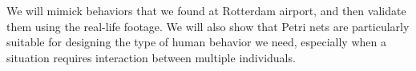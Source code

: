 \documentclass[11pt, a4paper]{book}
\begin{document}
We will mimick behaviors that we found at Rotterdam airport, and then validate them using the real-life footage. We will also show that Petri nets are particularly suitable for designing the type of human behavior we need, especially when a situation requires interaction between multiple individuals.







\end{document}
